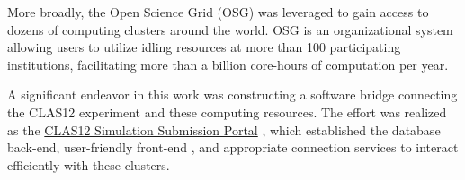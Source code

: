     





    More broadly, the Open Science Grid (OSG) \parencite{OSG2006OSG} \parencite{Sfiligoi2009TheGlideinWMS} \parencite{Pordes2007TheGrid} was leveraged to gain access to dozens of computing clusters around the world. OSG is an organizational system allowing users to utilize idling resources at more than 100 participating institutions, facilitating more than a billion core-hours of computation per year. 

    A significant endeavor in this work was constructing a software bridge connecting the CLAS12 experiment and these computing resources. The effort was realized as the \href{https://gemc.jlab.org/web_interface/index.php}{CLAS12 Simulation Submission Portal} \parencite{Ungaro2020CLAS12Framework}, which established the database back-end, user-friendly front-end , and appropriate connection services to interact efficiently with these clusters. 
      

